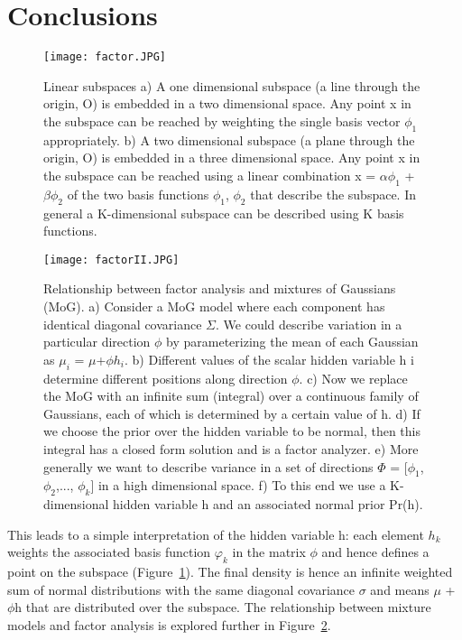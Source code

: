 \documentclass[10pt,twocolumn,letterpaper]{article}
\begin{document}
\section{Conclusions}
\begin{figure}[H]
\centering
\texttt{[image: factor.JPG]}
 \caption{Linear subspaces a) A one dimensional subspace (a line through the origin, O) is embedded in a two dimensional space. Any point x in the subspace can be reached by weighting the single basis vector $\phi_1$ appropriately. b) A two dimensional subspace (a plane through the origin, O) is embedded in a three dimensional space. Any point x in the subspace can be reached using a linear combination x = $\alpha\phi_1$ + $\beta\phi_2$ of the two basis functions $\phi_1$, $\phi_2$ that describe the subspace. In general a K-dimensional subspace can be described using K basis functions.}
\label{fig:one}
\end{figure}
\begin{figure}[H]
\centering
\texttt{[image: factorII.JPG]}
 \caption{Relationship between factor analysis and mixtures of Gaussians (MoG). a) Consider a MoG model where each component has identical diagonal covariance $\Sigma$. We could describe variation in a particular direction $\phi$ by parameterizing the mean of each Gaussian as $\mu_i$ = $\mu$+$\phi$$h_i$. b) Different values of the scalar hidden variable h i determine different positions along direction $\phi$. c) Now we replace the MoG with an infinite sum (integral) over a continuous family of Gaussians, each of which is determined by a certain value of h. d) If we choose the prior over the hidden variable to be normal, then this integral has a closed form solution and is a factor analyzer. e) More generally we want to describe variance in a set of directions $\Phi$ = [$\phi_1$, $\phi_2$,..., $\phi_k$] in a high dimensional space. f) To this end we use a K-dimensional hidden variable h and an associated normal prior Pr(h).}
\label{fig:two}
\end{figure}
This leads to a simple interpretation of the hidden variable h: each element $h_k$ weights the associated basis function $\varphi_k$ in the matrix $\phi$ and hence defines a point on the subspace (Figure~\ref{fig:one}). The final density is hence an infinite weighted sum of normal distributions with the same diagonal covariance $\sigma$ and means $\mu$ + $\phi$h that are distributed over the subspace. The relationship between mixture models and factor analysis is explored further in Figure~\ref{fig:two}.





{\small


}
\end{document}
